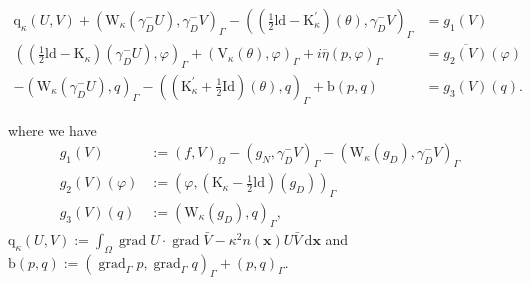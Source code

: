 \documentclass[10pt,journal,compsoc, onecolumn]{IEEEtran}
\begin{document}
\begin{align}
    \mathrm{q}_{\kappa}(U, V)+\left(\mathrm{W}_{\kappa}\left(\gamma_{D}^{-} U\right), \gamma_{D}^{-} V\right)_{\Gamma}-\left((\frac{1}{2} \mathrm{ld}-\mathrm{K}_{\kappa}^{\prime})(\theta), \gamma_{D}^{-} V\right)_{\Gamma} &=g_1(V) \nonumber\\
    \left((\frac{1}{2} \mathrm{ld}-\mathrm{K}_{\kappa})\left(\gamma_{D}^{-} U\right), \varphi\right)_{\Gamma}+\left(\mathrm{V}_{\kappa}(\theta), \varphi\right)_{\Gamma}+i \overline{\eta}(p, \varphi)_{\Gamma} &=\overline{g_2(V)}(\varphi) \label{eq:variational_formulation}\\
    -\left(\mathrm{W}_{\kappa}\left(\gamma_{D}^{-} U\right), q\right)_{\Gamma}-\left((\mathrm{K}_{\kappa}^{\prime}+\frac{1}{2} \mathrm{Id})(\theta), q\right)_{\Gamma}+\mathrm{b}(p, q) &=g_3(V)(q). \nonumber
\end{align}

where we have 
$$
\begin{aligned} 
    g_1(V) &:=(f, V)_{\Omega}-\left(g_{N}, \gamma_{D}^{-} V\right)_{\Gamma}-\left(\mathrm{W}_{\kappa}\left(g_{D}\right), \gamma_{D}^{-} V\right)_{\Gamma} \\ 
    g_2(V)(\varphi) &:=\left(\varphi,\left(\mathrm{K}_{\kappa}-\frac{1}{2} \mathrm{ld}\right)\left(g_{D}\right)\right)_{\Gamma} \\ 
    g_3(V)(q) &:=\left(\mathrm{W}_{\kappa}\left(g_{D}\right), q\right)_{\Gamma}, 
\end{aligned}
$$
\(\mathrm{q}_{\kappa}(U, V):=\int_{\Omega} \operatorname{grad} U \cdot \operatorname{grad} \bar{V}-\kappa^{2} n(\mathbf{x}) U \bar{V} \mathrm{~d} \mathbf{x}\) and 
\(\mathrm{b}(p, q):=\left(\operatorname{grad}_{\Gamma} p, \operatorname{grad}_{\Gamma} q\right)_{\Gamma}+(p, q)_{\Gamma}\).
\end{document}
